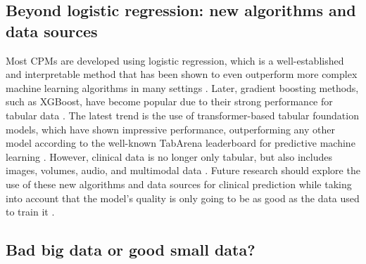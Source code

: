 
\subsection{Beyond logistic regression: new algorithms and data sources}
Most \glspl{CPM} are developed using logistic regression, which is a well-established and interpretable method that has been shown to even outperform more complex machine learning algorithms in many settings \cite{christodoulouSystematicReviewShows2019}. Later, gradient boosting methods, such as XGBoost, have become popular due to their strong performance for tabular data \cite{grinsztajnWhyDoTreeBased2022, chenXGBoostScalableTree2016}. The latest trend is the use of transformer-based tabular foundation models, which have shown impressive performance, outperforming any other model according to the well-known TabArena leaderboard for predictive machine learning \cite{quTabICLv2BetterFaster2026, hollmannAccuratePredictionsSmall2025, quTabICLTabularFoundation2025, ericksonTabArenaLivingBenchmark2025}. However, clinical data is no longer only tabular, but also includes images, volumes, audio, and multimodal data \cite{baltrusaitisMultimodalMachineLearning2017}. Future research should explore the use of these new algorithms and data sources for clinical prediction while taking into account that the model's quality is only going to be as good as the data used to train it \cite{Sanders2017GARBAGEIG}. 

\subsection{Bad big data or good small data?}

